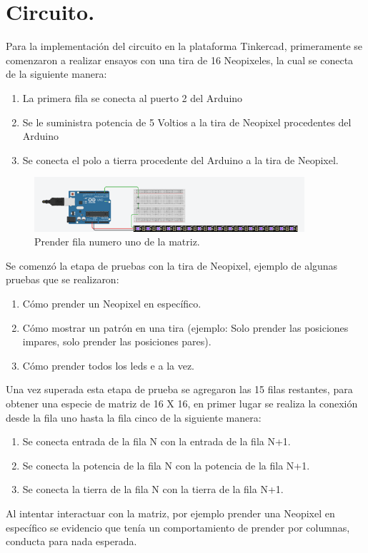 \documentclass{article}
\begin{document}
\section{Circuito.} \label{circuito}
Para la implementación del circuito en la plataforma Tinkercad, primeramente se comenzaron a realizar ensayos con una tira de 16 Neopixeles, la cual se conecta de la siguiente manera:
\begin{enumerate}
  \item La primera fila se conecta al puerto 2 del Arduino
  \item Se le suministra potencia de 5 Voltios a la tira de Neopixel procedentes del Arduino
  \item Se conecta el polo a tierra procedente del Arduino a la tira de Neopixel.
\end{enumerate}
\begin{figure}[h]
  \includegraphics[width=10cm]{figura_1.png}
  \centering
  \caption{Prender fila numero uno de la matriz.}
  \label{fig:fila_uno}
\end{figure}
Se comenzó la etapa de pruebas con la tira de Neopixel, ejemplo de algunas pruebas que se realizaron:
\begin{enumerate}
    \item Cómo prender un Neopixel en específico.
    \item Cómo mostrar un patrón en una tira (ejemplo: Solo prender las posiciones impares, solo prender las posiciones pares).
    \item Cómo prender todos los leds e a la vez.
\end{enumerate}
Una vez superada esta etapa de prueba se agregaron las 15 filas restantes, para obtener una especie de matriz de 16 X 16, en primer lugar se realiza la conexión desde la fila uno hasta la fila cinco de la siguiente manera:
\begin{enumerate}
    \item Se conecta entrada de la fila N con la entrada de la fila N+1.
    \item Se conecta la potencia de la fila N con la potencia de la fila N+1.
    \item Se conecta la tierra de la fila N con la tierra de la fila N+1.
\end{enumerate}
Al intentar interactuar con la matriz, por ejemplo prender una Neopixel en específico se evidencio que tenía un comportamiento de prender por columnas, conducta para nada esperada.\\
\end{document}
